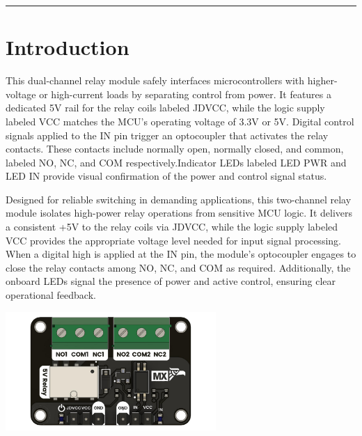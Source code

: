 \documentclass[10pt]{article}
\title{}
\author{}
\date{}
\begin{document}
\noindent
{}
\vspace{1em}
\hrule
\vspace{1.5em}

\section*{Introduction}
\vspace{0.5em}
\noindent
\begin{minipage}[t]{0.62\textwidth}
\setlength{\parskip}{0.75em}
\justifying
This dual-channel relay module safely interfaces microcontrollers with higher-voltage or high-current loads by separating control from power. It features a dedicated 5V rail for the relay coils labeled JDVCC, while the logic supply labeled VCC matches the MCU’s operating voltage of 3.3V or 5V. Digital control signals applied to the IN pin trigger an optocoupler that activates the relay contacts. These contacts include normally open, normally closed, and common, labeled NO, NC, and COM respectively.Indicator LEDs labeled LED PWR and LED IN provide visual confirmation of the power and control signal status.

\par

Designed for reliable switching in demanding applications, this two-channel relay module isolates high-power relay operations from sensitive MCU logic. It delivers a consistent +5V to the relay coils via JDVCC, while the logic supply labeled VCC provides the appropriate voltage level needed for input signal processing. When a digital high is applied at the IN pin, the module’s optocoupler engages to close the relay contacts among NO, NC, and COM as required. Additionally, the onboard LEDs signal the presence of power and active control, ensuring clear operational feedback.
\end{minipage}
\hfill
\begin{minipage}[t]{0.35\textwidth}
\centering
\vspace{-0.5em}
\includegraphics[height=4.5cm,keepaspectratio]{./images/product.jpg}
\end{minipage}
\end{document}
